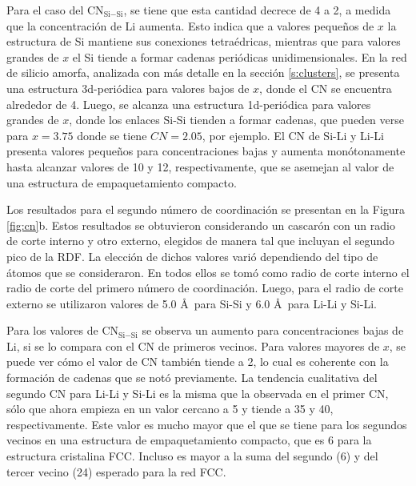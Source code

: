 Para el caso del CN$_{\text{Si}-\text{Si}}$, se tiene que esta cantidad decrece de 4 a 2, a 
medida que la concentración de Li aumenta. Esto indica que a valores pequeños de 
$x$ la estructura de Si mantiene sus conexiones tetraédricas, mientras que para
valores grandes de $x$ el Si tiende a formar cadenas periódicas unidimensionales.
En la red de silicio amorfa, analizada con más detalle en la sección 
\ref{s:clusters}, se presenta una estructura 3d-periódica para valores bajos de 
$x$, donde el CN se encuentra alrededor de 4. Luego, se alcanza una estructura 1d-periódica 
para valores grandes de $x$, donde los enlaces Si-Si tienden a formar 
cadenas, que pueden verse para $x = 3.75$ donde se tiene $CN = 2.05$, por ejemplo.
El CN de Si-Li y Li-Li presenta valores pequeños para concentraciones 
bajas y aumenta monótonamente hasta alcanzar valores de 10 y 12, respectivamente, 
que se asemejan al valor de una estructura de empaquetamiento compacto.

Los resultados para el segundo número de coordinación se presentan en la Figura 
\ref{fig:cn}b. Estos resultados se obtuvieron considerando un cascarón con un 
radio de corte interno y otro externo, elegidos de manera tal que incluyan el 
segundo pico de la RDF. La elección de dichos valores varió dependiendo del tipo
de átomos que se consideraron. En todos ellos se tomó como radio de corte interno 
el radio de corte del primero número de coordinación. Luego, para el radio de 
corte externo se utilizaron valores de 5.0 \AA\ para Si-Si y 6.0 \AA\ para Li-Li
y Si-Li.

Para los valores de CN$_{\text{Si}-\text{Si}}$ se observa un aumento para concentraciones bajas
de Li, si se lo compara con el CN de primeros vecinos. Para valores mayores de $x$,
se puede ver cómo el valor de CN también tiende a 2, lo cual es coherente con la
formación de cadenas que se notó previamente. La tendencia cualitativa del segundo
CN para Li-Li y Si-Li es la misma que la observada en el primer CN, sólo que ahora
empieza en un valor cercano a 5 y tiende a 35 y 40, respectivamente. Este valor 
es mucho mayor que el que se tiene para los segundos vecinos en una estructura 
de empaquetamiento compacto, que es 6 para la estructura cristalina FCC. Incluso 
es mayor a la suma del segundo (6) y del tercer vecino (24) esperado para la red 
FCC.
